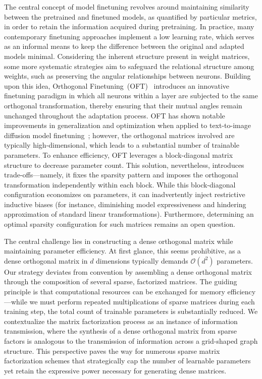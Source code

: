 The central concept of model finetuning revolves around maintaining similarity between the pretrained and finetuned models, as quantified by particular metrics, in order to retain the information acquired during pretraining. In practice, many contemporary finetuning approaches implement a low learning rate, which serves as an informal means to keep the difference between the original and adapted models minimal. Considering the inherent structure present in weight matrices, some more systematic strategies aim to safeguard the relational structure among weights, such as preserving the angular relationships between neurons. Building upon this idea, Orthogonal Finetuning~(OFT)~\cite{qiu2023controlling} introduces an innovative finetuning paradigm in which all neurons within a layer are subjected to the same orthogonal transformation, thereby ensuring that their mutual angles remain unchanged throughout the adaptation process. OFT has shown notable improvements in generalization and optimization when applied to text-to-image diffusion model finetuning~\cite{qiu2023controlling}; however, the orthogonal matrices involved are typically high-dimensional, which leads to a substantial number of trainable parameters. To enhance efficiency, OFT leverages a block-diagonal matrix structure to decrease parameter count. This solution, nevertheless, introduces trade-offs—namely, it fixes the sparsity pattern and imposes the orthogonal transformation independently within each block. While this block-diagonal configuration economizes on parameters, it can inadvertently inject restrictive inductive biases (for instance, diminishing model expressiveness and hindering approximation of standard linear transformations). Furthermore, determining an optimal sparsity configuration for such matrices remains an open question.

The central challenge lies in constructing a dense orthogonal matrix while maintaining parameter efficiency. At first glance, this seems prohibitive, as a dense orthogonal matrix in $d$ dimensions typically demands $\mathcal{O}(d^2)$ parameters. Our strategy deviates from convention by assembling a dense orthogonal matrix through the composition of several sparse, factorized matrices. The guiding principle is that computational resources can be exchanged for memory efficiency—while we must perform repeated multiplications of sparse matrices during each training step, the total count of trainable parameters is substantially reduced. We contextualize the matrix factorization process as an instance of information transmission, where the synthesis of a dense orthogonal matrix from sparse factors is analogous to the transmission of information across a grid-shaped graph structure. This perspective paves the way for numerous sparse matrix factorization schemes that strategically cap the number of learnable parameters yet retain the expressive power necessary for generating dense matrices.

